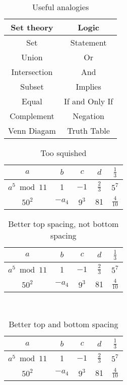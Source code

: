 \documentclass[12pt,letterpaper]{amsart}
\newcommand{\tfix}{\rule{0pt}{2.6ex}}
\newcommand{\bfix}{\rule[-1.2ex]{0pt}{0pt}}
\theoremstyle{plain}
\theoremstyle{definition}
\numberwithin{equation}{section}
\begin{document}
\begin{table}[ht]
\begin{center}
\begin{tabular}{|c||c|} \hline 
Set theory & Logic \\ \hline
Set & Statement \\
Union & Or \\
Intersection & And \\
Subset & Implies \\
Equal & If and Only If \\
Complement & Negation \\
Venn Diagam & Truth Table \\ \hline
\end{tabular}
\caption{Useful analogies}\label{tab2}
\end{center}
\end{table}



\begin{table}[ht]
\begin{center}
\begin{tabular}{c||c|c|c|c}  \hline 
$a$ & $b$ & $c$ & $d$ & $\frac{1}{3}$ \\ \hline
$a^{5} \bmod 11$ & 1& $-1$ & $\frac{2}{3}$ & $5^7$    \\ \hline 
$50^2$ & $-a_4$ & $9^3$ & 81 & $\frac{4}{10}$  \\ \hline
\end{tabular}
\caption{Too squished }\label{tootop}
\end{center}
\end{table}


\begin{table}[ht]
\begin{center}
\begin{tabular}{c||c|c|c|c} \hline
\tfix $a$  & $b$ & $c$ & $d$ & $\frac{1}{3}$ \\ \hline
\tfix $a^{5} \bmod 11$ & 1& $-1$ & $\frac{2}{3}$ & $5^7$    \\ \hline 
\tfix $50^2$ & $-a_4$ & $9^3$ & 81 & $\frac{4}{10}$ \\ \hline
\end{tabular} \\
\caption{Better top spacing, not bottom spacing}\label{tootop2}
\end{center}
\end{table}

\begin{table}[ht]
\begin{center}
\begin{tabular}{c||c|c|c|c} \hline
\tfix \bfix $a$  & $b$ & $c$ & $d$ &  $\frac{1}{3}$ \\ \hline
\tfix \bfix $a^{5} \bmod 11$ & 1& $-1$ & $\frac{2}{3}$ & $5^7$    \\ \hline 
\tfix \bfix $50^2$ & $-a_4$ & $9^3$ & 81 & $\frac{4}{10}$ \\ \hline 
\end{tabular}
\caption{Better top and bottom spacing}\label{tootop3}
\end{center}
\end{table}
\end{document}
